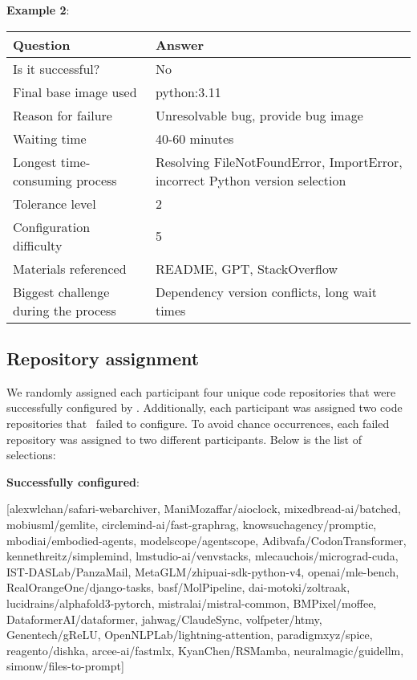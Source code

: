 \textbf{Example 2}:

\begin{longtable}{|l|l|}
\hline
\textbf{Question} & \textbf{Answer} \\ 
\hline
Is it successful? & No \\ 
\hline
Final base image used & python:3.11 \\ 
\hline
Reason for failure & Unresolvable bug, provide bug image \\ 
\hline
Waiting time & 40-60 minutes \\ 
\hline
Longest time-consuming process & Resolving FileNotFoundError, ImportError, incorrect Python version selection \\ 
\hline
Tolerance level & 2 \\ 
\hline
Configuration difficulty & 5 \\ 
\hline
Materials referenced & README, GPT, StackOverflow \\ 
\hline
Biggest challenge during the process & Dependency version conflicts, long wait times \\ 
\hline
\end{longtable}

\subsection{Repository assignment}
We randomly assigned each participant four unique code repositories that were successfully configured by \tool. Additionally, each participant was assigned two code repositories that \tool~failed to configure. To avoid chance occurrences, each failed repository was assigned to two different participants. Below is the list of selections:

\textbf{Successfully configured}:

[alexwlchan/safari-webarchiver, ManiMozaffar/aioclock, mixedbread-ai/batched, mobiusml/gemlite, circlemind-ai/fast-graphrag, knowsuchagency/promptic, mbodiai/embodied-agents, modelscope/agentscope, Adibvafa/CodonTransformer, kennethreitz/simplemind, lmstudio-ai/venvstacks, mlecauchois/micrograd-cuda, IST-DASLab/PanzaMail, MetaGLM/zhipuai-sdk-python-v4, openai/mle-bench, RealOrangeOne/django-tasks, basf/MolPipeline, dai-motoki/zoltraak, lucidrains/alphafold3-pytorch, mistralai/mistral-common, BMPixel/moffee, DataformerAI/dataformer, jahwag/ClaudeSync, volfpeter/htmy, Genentech/gReLU, OpenNLPLab/lightning-attention, paradigmxyz/spice, reagento/dishka, arcee-ai/fastmlx, KyanChen/RSMamba, neuralmagic/guidellm, simonw/files-to-prompt]

